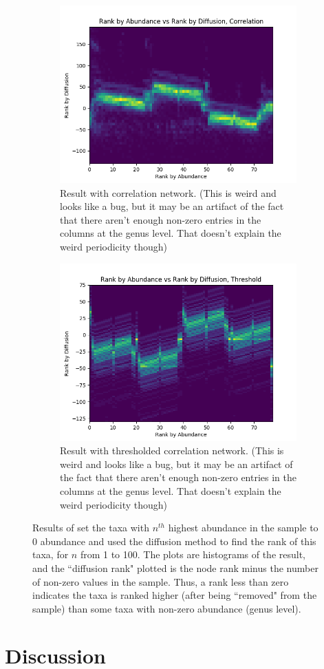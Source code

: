 \documentclass[10pt]{article}
\theoremstyle{definition}
\numberwithin{theorem}{section}
\numberwithin{definition}{section}
\numberwithin{lemma}{section}
\numberwithin{corollary}{section}
\numberwithin{clm}{section}
\numberwithin{rmk}{section}
\begin{document}
\begin{figure}
	\begin{subfigure}[h]{0.45\textwidth}
		\includegraphics[scale = 0.5]{../rank_v_rank_cor.png}
		\caption{Result with correlation network. (This is weird and looks like a bug, but it may be an artifact of the fact that there aren't enough non-zero entries in the columns at the genus level. That doesn't explain the weird periodicity though)}
	\end{subfigure}
	\begin{subfigure}[h]{0.45\textwidth}
	\includegraphics[scale = 0.5]{../rank_v_rank_thr.png}
	\caption{Result with thresholded correlation network. (This is weird and looks like a bug, but it may be an artifact of the fact that there aren't enough non-zero entries in the columns at the genus level. That doesn't explain the weird periodicity though)}
\end{subfigure}
\caption{Results of set the taxa with $n^{th}$ highest abundance in the sample to $0$ abundance and used the diffusion method to find the rank of this taxa, for $n$ from 1 to 100. The plots are histograms of the result, and the ``diffusion rank" plotted is the node rank minus the number of non-zero values in the sample. Thus, a rank less than zero indicates the taxa is ranked higher (after being ``removed" from the sample) than some taxa with non-zero abundance (genus level).}
\end{figure}

\section{Discussion}



\end{document}
